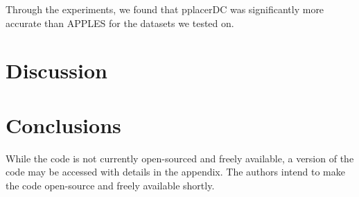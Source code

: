 \documentclass[10pt]{article}
\begin{document}
Through the experiments, we found that pplacerDC was significantly more accurate than APPLES for the datasets we tested on.


\section{Discussion}


\section{Conclusions}

While the code is not currently open-sourced and freely available, a version of the code
may be accessed with details in the appendix.
The authors intend to make the code open-source and freely available shortly.



\end{document}
